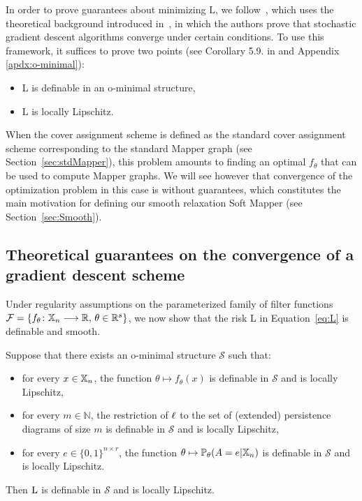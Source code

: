 In order to prove guarantees about minimizing $\text{L}$, we follow~\cite{carriere2021optimizing}, which uses the theoretical background introduced in~\cite{davis2020stochastic},
in which the authors prove that stochastic gradient descent algorithms converge under certain conditions. 
To use this framework, it suffices to prove two points (see Corollary 5.9. in \cite{davis2020stochastic} and Appendix \ref{apdx:o-minimal}):
 
\begin{itemize}
    \item L is definable in an o-minimal structure, %
    \item L is locally Lipschitz.
\end{itemize}


\begin{remark}
When the cover assignment scheme is defined as the standard cover assignment scheme corresponding to the standard Mapper graph (see Section~\ref{sec:stdMapper}), %
this problem amounts to finding an optimal $f_\theta$ that can be used to compute Mapper graphs. We will see however that convergence of the optimization problem in this case is without guarantees, 
which constitutes the main motivation for defining our smooth relaxation Soft Mapper (see Section~\ref{sec:Smooth}).
\end{remark}
 



\subsection{Theoretical guarantees on the convergence of a gradient descent scheme}

Under regularity assumptions on the parameterized family of filter functions $\mathcal F=\{f_\theta\colon\mathbb{X}_n \longrightarrow\mathbb{R},\,\theta\in\mathbb{R}^s\}$, we now show that the risk $\text{L}$ in Equation~\eqref{eq:L} is definable and smooth.

\begin{theorem}
\label{thm1}
    Suppose that there exists an o-minimal structure $\mathcal{S}$ such that: 
    \begin{itemize}
        \item for every $x\in\mathbb{X}_n$, the function $\theta\mapsto f_\theta(x)$ is definable in $\mathcal{S}$ and is locally Lipschitz,
        \item for every $m\in\mathbb{N}$, the restriction of $\ell$ to the set of (extended) persistence diagrams of size $m$ 
is definable in $\mathcal{S}$ and is locally Lipschitz,
        \item for every $e\in{\{0,1\}}^{n\times r}$, the function $\theta\mapsto \mathbb{P}_\theta(A =e| \mathbb{X}_n)$ is definable in $\mathcal{S}$ and is locally Lipschitz.
    \end{itemize}
    Then $\textup{L}$ is definable in $\mathcal{S}$ and is locally Lipschitz.
\end{theorem}




